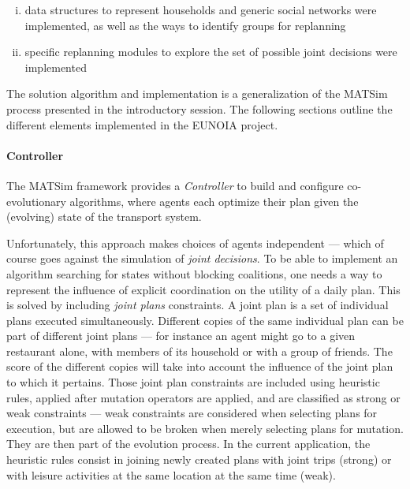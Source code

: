 {\begin{enumerate}
  \begin{enumerate}[i)]
  \item
    data structures to represent households and generic social networks
    were implemented, as well as the ways to identify groups for
    replanning
  \item
    specific replanning modules to explore the set of possible joint
    decisions were implemented
  \end{enumerate}
\end{enumerate}

The solution algorithm and implementation is a generalization of the
MATSim process presented in the introductory session. The following
sections outline the different elements implemented in the EUNOIA
project.

\paragraph{Controller}

The MATSim framework provides a \emph{Controller} to build and configure
co-evolutionary algorithms, where agents each optimize their plan given
the (evolving) state of the transport system.

Unfortunately, this approach makes choices of agents independent ---
which of course goes against the simulation of \emph{joint decisions}.
To be able to implement an algorithm searching for states without
blocking coalitions, one needs a way to represent the influence of
explicit coordination on the utility of a daily plan. This is solved by
including \emph{joint plans} constraints. A joint plan is a set of
individual plans executed simultaneously. Different copies of the same
individual plan can be part of different joint plans --- for instance an
agent might go to a given restaurant alone, with members of its
household or with a group of friends. The score of the different copies
will take into account the influence of the joint plan to which it
pertains. Those joint plan constraints are included using heuristic
rules, applied after mutation operators are applied, and are classified
as strong or weak constraints --- weak constraints are considered when
selecting plans for execution, but are allowed to be broken when merely
selecting plans for mutation. They are then part of the evolution
process. In the current application, the heuristic rules consist in
joining newly created plans with joint trips (strong) or with leisure
activities at the same location at the same time (weak).

}
